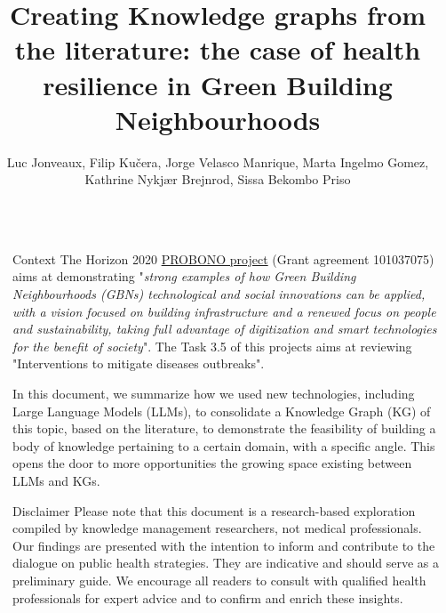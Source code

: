 \documentclass[final]{beamer}
\title{Creating Knowledge graphs from the literature: the case of health resilience in Green Building Neighbourhoods} %
\author{Luc Jonveaux, Filip Kučera, Jorge Velasco Manrique, Marta Ingelmo Gomez, Kathrine Nykjær Brejnrod,  Sissa Bekombo Priso} %
\institute{The Integrator-centric approach for realising innovative energy efficient buildings in connected sustainable green neighbourhoods project} %
\newlength{\sepmargin}
\newlength{\onecolwid}
\begin{document}
\textblockorigin{10mm}{10mm} %
  \setlength{\belowcaptionskip}{2ex} %
  \setlength\belowdisplayshortskip{1ex} %
  
  


      \begin{columns}[t] %
	  
      \begin{column}{\sepmargin}\end{column}
      
	    \begin{column}{\onecolwid} %


		  \begin{block}{Context}
The Horizon 2020 \href{https://doi.org/10.3030/101037075}{PROBONO project} (Grant agreement  101037075) aims at demonstrating "\textit{strong examples of how Green Building Neighbourhoods (GBNs) technological and social innovations can be applied, with a vision focused on building infrastructure and a renewed focus on people and sustainability, taking full advantage of digitization and smart technologies for the benefit of society}". The Task 3.5 of this projects  aims at reviewing "Interventions to mitigate diseases outbreaks".

In this document, we summarize how we used new technologies, including Large Language Models (LLMs), to consolidate a Knowledge Graph (KG) of this topic, based on the literature, to demonstrate the feasibility of building a body of knowledge pertaining to a certain domain, with a specific angle. This opens the door to more opportunities the growing space existing between LLMs and KGs.
\end{block}

\begin{block}{Disclaimer}
Please note that this document is a research-based exploration compiled by knowledge management researchers, not medical professionals. Our findings are presented with the intention to inform and contribute to the dialogue on public health strategies. They are indicative and should serve as a preliminary guide. We encourage all readers to consult with qualified health professionals for expert advice and to confirm and enrich these insights.


\end{block}
\end{column}
\end{columns}
\end{document}
